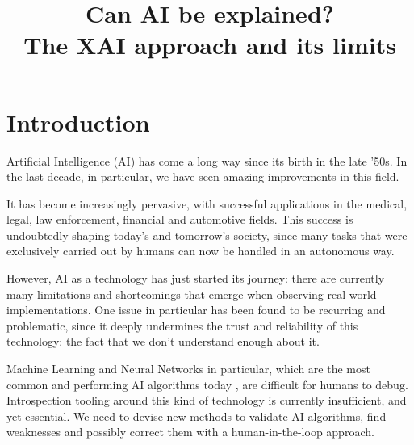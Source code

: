 \documentclass[conference]{IEEEtran}
\newcommand{\cit}{\todo[tickmarkheight=0.2cm]{cit}}
\begin{document}
\title{Can AI be explained? \\
    The XAI approach and its limits}

\author{
}

\maketitle

\begin{abstract}
\end{abstract}

\section{Introduction}
\label{sec:intro}

Artificial Intelligence (AI) has come a long way since its birth in the late '50s.
\cit In the last decade, in particular, we have seen amazing
improvements in this field.

It has become increasingly pervasive, with successful applications in the
medical, legal, law enforcement, financial and automotive fields. \cit This success
is undoubtedly shaping today's and tomorrow's society, since many tasks that
were exclusively carried out by humans can now be handled in an autonomous way.


However, AI as a technology has just started its journey: there are currently
many limitations and shortcomings that emerge when observing real-world implementations. One issue in particular has been found to be
recurring and problematic, since it deeply undermines the trust and reliability
of this technology: the fact that we don't understand enough about it. 

Machine Learning and Neural Networks in particular, which are the most common
and performing AI algorithms today \cit , are difficult for humans to debug.
Introspection tooling around this kind of technology is currently insufficient,
and yet essential. We need to devise new methods to validate AI algorithms, find
weaknesses and possibly correct them with a human-in-the-loop approach.
\end{document}
